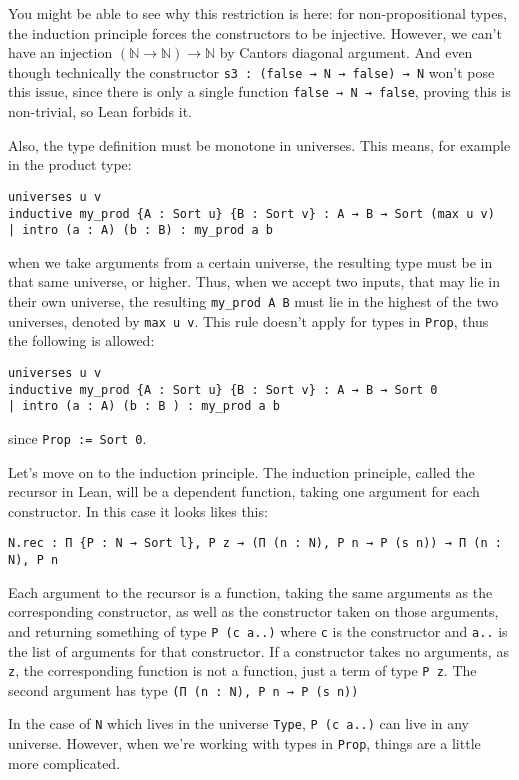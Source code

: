\documentclass[a4paper, 12pt]{article}
\newcommand{\N}{\mathbb{N}}
\newcommand{\lean}[1]{\texttt{#1}}
\theoremstyle{changedot}
\theoremstyle{changedotbreak}
\theoremstyle{nonumberplain}
\begin{document}
You might be able to see why this restriction is here: for non-propositional types, the induction principle forces the constructors to be injective. However, we can't have an injection $(\N \to \N) \to \N$ by Cantors diagonal argument. And even though technically the constructor \lean{s3 : (false → N → false) → N} won't pose this issue, since there is only a single function \lean{false → N → false}, proving this is non-trivial, so Lean forbids it.

Also, the type definition must be monotone in universes. This means, for example in the product type:

\begin{verbatim}
universes u v
inductive my_prod {A : Sort u} {B : Sort v} : A → B → Sort (max u v)
| intro (a : A) (b : B) : my_prod a b
\end{verbatim}

when we take arguments from a certain universe, the resulting type must be in that same universe, or higher. Thus, when we accept two inputs, that may lie in their own universe, the resulting \lean{my_prod A B} must lie in the highest of the two universes, denoted by \lean{max u v}. This rule doesn't apply for types in \lean{Prop}, thus the following is allowed:

\begin{verbatim}
universes u v
inductive my_prod {A : Sort u} {B : Sort v} : A → B → Sort 0
| intro (a : A) (b : B ) : my_prod a b
\end{verbatim}

since \lean{Prop := Sort 0}.

Let's move on to the induction principle. The induction principle, called the recursor in Lean, will be a dependent function, taking one argument for each constructor. In this case it looks likes this:
\begin{verbatim}
N.rec : Π {P : N → Sort l}, P z → (Π (n : N), P n → P (s n)) → Π (n : N), P n
\end{verbatim}
Each argument to the recursor is a function, taking the same arguments as the corresponding constructor, as well as the constructor taken on those arguments, and returning something of type \lean{P (c a..)} where \lean{c} is the constructor and \lean{a..} is the list of arguments for that constructor. If a constructor takes no arguments, as \lean{z}, the corresponding function is not a function, just a term of type \lean{P z}. The second argument has type \lean{(Π (n : N), P n → P (s n))}

In the case of \lean{N} which lives in the universe \lean{Type}, \lean{P (c a..)} can live in any universe. However, when we're working with types in \lean{Prop}, things are a little more complicated.
\end{document}
